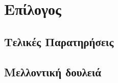 \chapter{Επίλογος}\label{ch:conclusion}

\section{Τελικές Παρατηρήσεις}

\section{Μελλοντική δουλειά}

